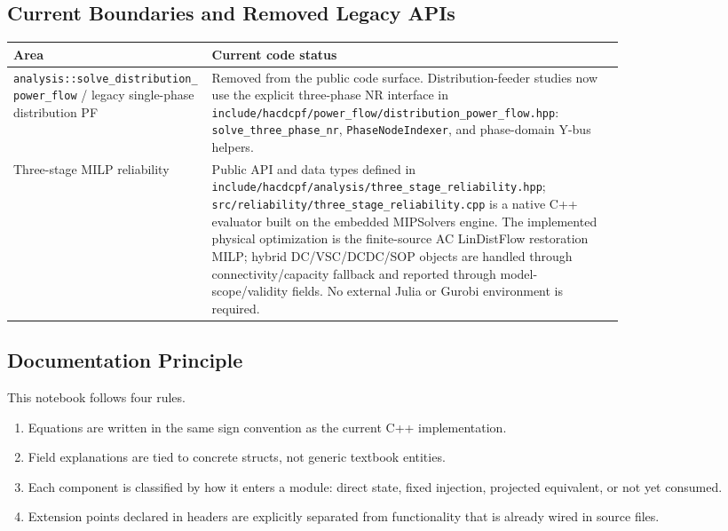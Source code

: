 \subsection{Current Boundaries and Removed Legacy APIs}
\label{sec:scope-boundary}

\begin{longtable}{L{0.26\linewidth}L{0.54\linewidth}}
\toprule
Area & Current code status \\
\midrule
\endhead
\texttt{analysis::solve\_distribution\_power\_flow} / legacy single-phase distribution PF & Removed from the public code surface.  Distribution-feeder studies now use the explicit three-phase NR interface in \texttt{include/hacdcpf/power\_flow/distribution\_power\_flow.hpp}: \texttt{solve\_three\_phase\_nr}, \texttt{PhaseNodeIndexer}, and phase-domain Y-bus helpers. \\
Three-stage MILP reliability & Public API and data types defined in \texttt{include/hacdcpf/analysis/three\_stage\_reliability.hpp}; \texttt{src/reliability/three\_stage\_reliability.cpp} is a native C++ evaluator built on the embedded MIPSolvers engine.  The implemented physical optimization is the finite-source AC LinDistFlow restoration MILP; hybrid DC/VSC/DCDC/SOP objects are handled through connectivity/capacity fallback and reported through model-scope/validity fields.  No external Julia or Gurobi environment is required. \\

\bottomrule
\end{longtable}

\subsection{Documentation Principle}

This notebook follows four rules.
\begin{enumerate}
  \item Equations are written in the same sign convention as the current C++ implementation.
  \item Field explanations are tied to concrete structs, not generic textbook entities.
  \item Each component is classified by how it enters a module: direct state, fixed injection, projected equivalent, or not yet consumed.
  \item Extension points declared in headers are explicitly separated from functionality that is already wired in source files.
\end{enumerate}

